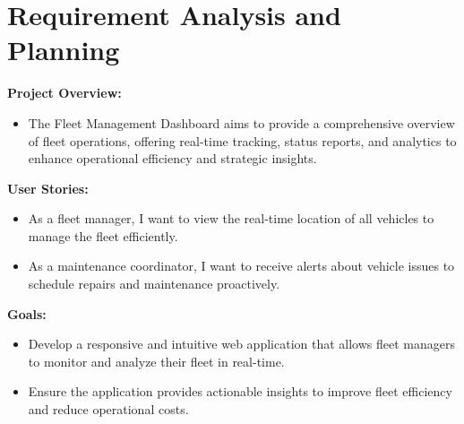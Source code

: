 \section*{Requirement Analysis and Planning}

\textbf{Project Overview:}
\begin{itemize}
    \item The Fleet Management Dashboard aims to provide a comprehensive overview of fleet operations, offering real-time tracking, status reports, and analytics to enhance operational efficiency and strategic insights.
\end{itemize}

\textbf{User Stories:}
\begin{itemize}
    \item As a fleet manager, I want to view the real-time location of all vehicles to manage the fleet efficiently.
    \item As a maintenance coordinator, I want to receive alerts about vehicle issues to schedule repairs and maintenance proactively.
\end{itemize}

\textbf{Goals:}
\begin{itemize}
    \item Develop a responsive and intuitive web application that allows fleet managers to monitor and analyze their fleet in real-time.
    \item Ensure the application provides actionable insights to improve fleet efficiency and reduce operational costs.
\end{itemize}
